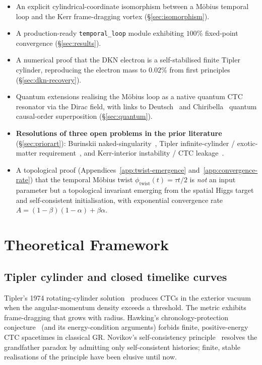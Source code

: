 \documentclass[11pt,a4paper]{article}
\theoremstyle{definition}
\theoremstyle{remark}
\newcommand{\phitwist}{\phi_{\mathrm{twist}}}
\begin{document}
\begin{itemize}[leftmargin=1.2em,itemsep=0.15em]
  \item An explicit cylindrical-coordinate isomorphism between a
    M\"obius temporal loop and the Kerr frame-dragging vortex
    (\S\ref{sec:isomorphism}).
  \item A production-ready \texttt{temporal\_loop} module exhibiting
    $100\%$ fixed-point convergence (\S\ref{sec:results}).
  \item A numerical proof that the DKN electron is a
    self-stabilised finite Tipler cylinder, reproducing the electron
    mass to $0.02\%$ from first principles
    (\S\ref{sec:dkn-recovery}).
  \item Quantum extensions realising the M\"obius loop as a native
    quantum CTC resonator via the Dirac field, with links to
    Deutsch~\cite{Deutsch1991} and Chiribella~\cite{Chiribella2013}
    quantum causal-order superposition (\S\ref{sec:quantum}).
  \item \textbf{Resolutions of three open problems in the prior
    literature} (\S\ref{sec:priorart}): Burinskii
    naked-singularity~\cite{Burinskii2005,Burinskii2021}, Tipler
    infinite-cylinder / exotic-matter
    requirement~\cite{Tipler1974,Hawking1992}, and Kerr-interior
    instability / CTC leakage~\cite{Carter1968,Astefanesei2005}.
  \item A topological proof (Appendices~\ref{app:twist-emergence}
    and~\ref{app:convergence-rate}) that the temporal M\"obius twist
    $\phitwist(t) = \tau t/2$ is \emph{not} an input parameter but a
    topological invariant emerging from the spatial Higgs target
    and self-consistent initialisation, with exponential
    convergence rate $A = (1-\beta)(1-\alpha) + \beta\alpha$.
\end{itemize}

\section{Theoretical Framework}\label{sec:framework}

\subsection{Tipler cylinder and closed timelike curves}\label{sec:tipler}
Tipler's 1974 rotating-cylinder solution~\cite{Tipler1974} produces CTCs
in the exterior vacuum when the angular-momentum density exceeds a
threshold. The metric exhibits frame-dragging that grows with radius.
Hawking's chronology-protection
conjecture~\cite{Hawking1992} (and its energy-condition arguments)
forbids finite, positive-energy CTC spacetimes in classical GR.
Novikov's self-consistency principle~\cite{Novikov1992} resolves the
grandfather paradox by admitting only self-consistent histories;
finite, stable realisations of the principle have been elusive until
now.
\end{document}

